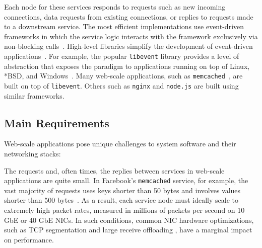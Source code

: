 Each node for these services responds to requests such as new incoming
connections, data requests from existing connections, or replies to
requests made to a downstream service.  The most efficient
implementations use event-driven frameworks in which the service logic
interacts with the framework exclusively via non-blocking
calls~\cite{DBLP:conf/usenix/PaiDZ99,DBLP:conf/sosp/WelshCB01}. %
High-level libraries simplify the development of event-driven
applications~\cite{provos2003libevent,libev,libuv}.  For example, the
popular \texttt{libevent} library provides a level of abstraction that
exposes the paradigm to applications running on top of Linux, *BSD,
and Windows~\cite{provos2003libevent}. Many web-scale applications,
such as \texttt{memcached}~\cite{url:memcached}, are built on top of
\texttt{libevent}.  Others such as \texttt{nginx} and \texttt{node.js} are built using
similar frameworks.


\subsection{Main Requirements}
\label{sec:motivation:challenges}

Web-scale applications pose unique challenges to system
software and their networking stacks:


 The requests and, often times, the
replies between services in web-scale applications are quite small. In
Facebook's \texttt{memcached} service, for example, the vast majority
of requests uses keys shorter than 50 bytes and involves values shorter
than 500 bytes~\cite{Atikoglu:2012:WAL}. As a result, each service
node must ideally scale to extremely high packet rates, measured in
millions of packets per second on 10 GbE or 40 GbE NICs.  In such
conditions, common NIC hardware optimizations, such as TCP
segmentation and large receive offloading , have a marginal impact on
performance.

